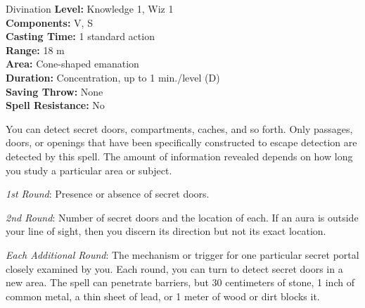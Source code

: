 {Divination}
{
	\textbf{Level:}
	Knowledge 1, Wiz 1\\
	\textbf{Components:}
	V, S\\
	\textbf{Casting Time:}
	1 standard action\\
	\textbf{Range:}
	18 m\\
	\textbf{Area:}
	Cone-shaped emanation\\
	\textbf{Duration:}
	Concentration, up to 1 min./level (D)\\
	\textbf{Saving Throw:}
	None\\
	\textbf{Spell Resistance:}
	No\\
}
{
	You can detect secret doors, compartments, caches, and so forth. Only passages, doors, or openings that have been specifically constructed to escape detection are detected by this spell. The amount of information revealed depends on how long you study a particular area or subject.

	\textit{1st Round}:
	Presence or absence of secret doors.

	\textit{2nd Round}:
	Number of secret doors and the location of each. If an aura is outside your line of sight, then you discern its direction but not its exact location.

	\textit{Each Additional Round}:
	The mechanism or trigger for one particular secret portal closely examined by you. Each round, you can turn to detect secret doors in a new area. The spell can penetrate barriers, but 30 centimeters of stone, 1 inch of common metal, a thin sheet of lead, or 1 meter of wood or dirt blocks it.

}
